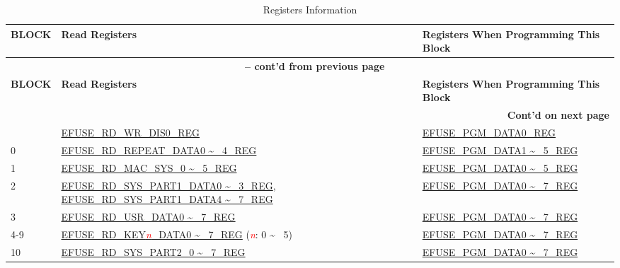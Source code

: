 \begin{longtable}[c]{|l|l|l|}
\caption{Registers Information}
\label{tab:efuse-softw-read-para}
\\\hline
    \rowcolor{lightgray}
        \textbf{BLOCK} & \textbf{Read Registers} & \textbf{Registers When Programming This Block}\\
    \endfirsthead
    
    \multicolumn{3}{c}{\bfseries \tablename\ \thetable{} -- cont'd from previous page}\\\hline
    
    \rowcolor{lightgray}
        \textbf{BLOCK} & \textbf{Read Registers} & \textbf{Registers When Programming This Block}\\
    \endhead
    
    \multicolumn{3}{r}{\textbf{Cont'd on next page}} \\
    \endfoot
    \endlastfoot
    \hline
0 & \hyperref[regdesc:EFUSERDWRDIS0REG]{EFUSE\_RD\_WR\_DIS0\_REG} & \hyperref[regdesc:EFUSEPGMDATANREG]{EFUSE\_PGM\_DATA0\_REG} \\\hline
0 & \hyperref[regdesc:EFUSERDREPEATDATA0REG]{EFUSE\_RD\_REPEAT\_DATA0 \textasciitilde~ 4\_REG} & \hyperref[regdesc:EFUSEPGMDATANREG]{EFUSE\_PGM\_DATA1 \textasciitilde~ 5\_REG} \\\hline
1 & \hyperref[regdesc:EFUSERDMACSYS0REG]{EFUSE\_RD\_MAC\_SYS\_0 \textasciitilde~ 5\_REG} & \hyperref[regdesc:EFUSEPGMDATANREG]{EFUSE\_PGM\_DATA0 \textasciitilde~ 5\_REG} \\\hline
2 & \hyperref[regdesc:EFUSERDSYSPART1DATA0REG]{EFUSE\_RD\_SYS\_PART1\_DATA0 \textasciitilde~ 3\_REG}, \hyperref[regdesc:EFUSERDSYSPART1DATA4TO7REG]{EFUSE\_RD\_SYS\_PART1\_DATA4 \textasciitilde~ 7\_REG} & \hyperref[regdesc:EFUSEPGMDATANREG]{EFUSE\_PGM\_DATA0 \textasciitilde~ 7\_REG} \\\hline
3 & \hyperref[regdesc:EFUSERDUSRDATANREG]{EFUSE\_RD\_USR\_DATA0 \textasciitilde~ 7\_REG} & \hyperref[regdesc:EFUSEPGMDATANREG]{EFUSE\_PGM\_DATA0 \textasciitilde~ 7\_REG} \\ \hline
4-9 & \hyperref[regdesc:EFUSERDKEY0DATANREG]{EFUSE\_RD\_KEY\textcolor{red}{\it{n}}\_DATA0 \textasciitilde~ 7\_REG} (\textcolor{red}{\it{n}}: 0 \textasciitilde~ 5) & \hyperref[regdesc:EFUSEPGMDATANREG]{EFUSE\_PGM\_DATA0 \textasciitilde~ 7\_REG} \\\hline
10 & \hyperref[regdesc:EFUSERDSYSPART2DATANREG]{EFUSE\_RD\_SYS\_PART2\_0 \textasciitilde~ 7\_REG} & \hyperref[regdesc:EFUSEPGMDATANREG]{EFUSE\_PGM\_DATA0 \textasciitilde~ 7\_REG} \\\hline
\end{longtable}
